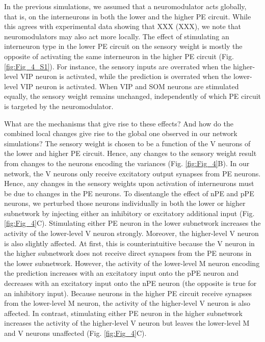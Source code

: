 \documentclass[10pt,a4paper,draft]{article}
\begin{document}
In the previous simulations, we assumed that a neuromodulator acts globally, that is, on the interneurons in both the lower and the higher PE circuit. While this agrees with experimental data showing that XXX (XXX), we note that neuromodulators may also act more locally. The effect of stimulating an interneuron type in the lower PE circuit on the sensory weight is mostly the opposite of activating the same interneuron in the higher PE circuit (Fig. \ref{fig:Fig_4_S1}). For instance, the sensory inputs are overrated when the higher-level VIP neuron is activated, while the prediction is overrated when the lower-level VIP neuron is activated. When VIP and SOM neurons are stimulated equally, the sensory weight remains unchanged, independently of which PE circuit is targeted by the neuromodulator. 

What are the mechanisms that give rise to these effects? And how do the combined local changes give rise to the global one observed in our network simulations? The sensory weight is chosen to be a function of the V neurons of the lower and higher PE circuit. Hence, any changes to the sensory weight result from changes to the neurons encoding the variances (Fig. \ref{fig:Fig_4}B). In our network, the V neurons only receive excitatory output synapses from PE neurons. Hence, any changes in the sensory weights upon activation of interneurons must be due to changes in the PE neurons. To disentangle the effect of nPE and pPE neurons, we perturbed those neurons individually in both the lower or higher subnetwork by injecting either an inhibitory or excitatory additional input (Fig. \ref{fig:Fig_4}C). Stimulating either PE neuron in the lower subnetwork increases the activity of the lower-level V neuron strongly. Moreover, the higher-level V neuron is also slightly affected. At first, this is counterintuitive because the V neuron in the higher subnetwork does not receive direct synapses from the PE neurons in the lower subnetwork. However, the activity of the lower-level M neuron encoding the prediction increases with an excitatory input onto the pPE neuron and decreases with an excitatory input onto the nPE neuron (the opposite is true for an inhibitory input). Because neurons in the higher PE circuit receive synapses from the lower-level M neuron, the activity of the higher-level V neuron is also affected. In contrast, stimulating either PE neuron in the higher subnetwork increases the activity of the higher-level V neuron but leaves the lower-level M and V neurons unaffected (Fig. \ref{fig:Fig_4}C).
\end{document}
